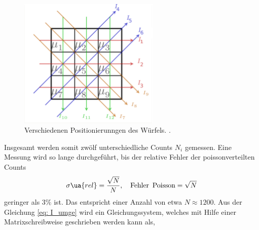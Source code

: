 \begin{figure}[h]
  \centering
  \includegraphics[width=0.6\textwidth]{pics/positionierung.pdf}
  \caption{Verschiedenen Positionierunngen des Würfels. \cite{luckyjosh}.} %
  \label{fig: positionierung}
\end{figure}

Insgesamt werden somit zwölf unterschiedliche Counts $N_i$ gemessen.
Eine Messung wird so lange durchgeführt, bis der relative Fehler der poissonverteilten Counts%
\begin{equation*}
  \sigma\ua{rel}=\frac{\sqrt{N}}{N}, \quad \text{Fehler\, Poisson}= \sqrt{N}
\end{equation*}
geringer als $3\%$ ist. Das entspricht einer Anzahl von etwa $N\approx 1200$.
Aus der Gleichung \eqref{eq: I_umge} wird ein Gleichungssystem, welches mit Hilfe einer
Matrixschreibweise geschrieben werden kann als,

